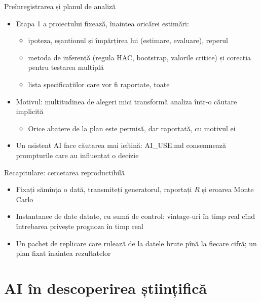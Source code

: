 \begin{frame}{Preînregistrarea și planul de analiză}
\itemsize{\small}
\begin{itemize}
    \item Etapa 1 a proiectului fixează, înaintea oricărei estimări:
    \begin{itemize}
        \item ipoteza, eșantionul și împărțirea lui (estimare, evaluare), reperul
        \item metoda de inferență (regula HAC, bootstrap, valorile critice) și corecția pentru testarea multiplă
        \item lista specificațiilor care vor fi raportate, toate
    \end{itemize}
    \item Motivul: multitudinea de alegeri mici transformă analiza într-o căutare implicită
    \begin{itemize}
        \item Orice abatere de la plan este permisă, dar raportată, cu motivul ei
    \end{itemize}
    \item Un asistent AI face căutarea mai ieftină: AI\_USE.md consemnează prompturile care au influențat o decizie
\end{itemize}
\end{frame}

\begin{frame}{Recapitulare: cercetarea reproductibilă}
\itemsize{\small}
\begin{itemize}
    \item Fixați sămînța o dată, transmiteți generatorul, raportați $R$ și eroarea Monte Carlo
    \item Instantanee de date datate, cu sumă de control; vintage-uri în timp real cînd întrebarea privește prognoza în timp real
    \item Un pachet de replicare care rulează de la datele brute pînă la fiecare cifră; un plan fixat înaintea rezultatelor
\end{itemize}
\end{frame}


\section{AI în descoperirea științifică}

